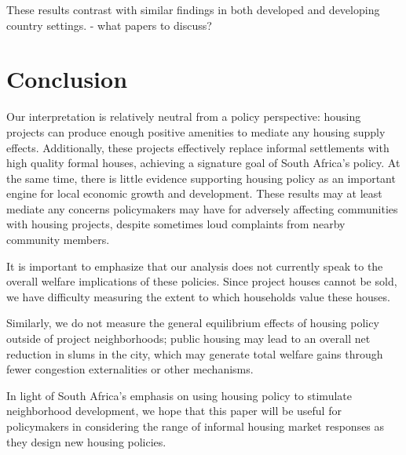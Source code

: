 \documentclass[12pt]{article}
\begin{document}
These results contrast with similar findings in both developed and developing country settings. - what papers to discuss?


\section{Conclusion}\label{section:conclusion}


Our interpretation is relatively neutral from a policy perspective: housing projects can produce enough positive amenities to mediate any housing supply effects.  Additionally, these projects effectively replace informal settlements with high quality formal houses, achieving a signature goal of South Africa's policy.  At the same time, there is little evidence supporting housing policy as an important engine for local economic growth and development.  These results may at least mediate any concerns policymakers may have for adversely affecting communities with housing projects, despite sometimes loud complaints from nearby community members.


It is important to emphasize that our analysis does not currently speak to the overall welfare implications of these policies.  Since project houses cannot be sold, we have difficulty measuring the extent to which households value these houses.  


Similarly, we do not measure the general equilibrium effects of housing policy outside of project neighborhoods; public housing may lead to an overall net reduction in slums in the city, which may generate total welfare gains through fewer congestion externalities or other mechanisms.  

In light of South Africa's emphasis on using housing policy to stimulate neighborhood development, we hope that this paper will be useful for policymakers in considering the range of informal housing market responses as they design new housing policies.

\end{document}
